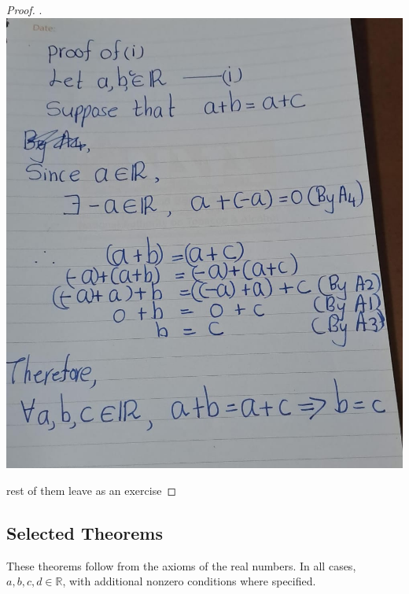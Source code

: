 \documentclass[
]{book}
\theoremstyle{definition}
\theoremstyle{definition}
\theoremstyle{definition}
\theoremstyle{definition}
\theoremstyle{remark}
\begin{document}
\begin{proof}
\leavevmode

.\\

\includegraphics[width=0.8\linewidth,height=\textheight,keepaspectratio]{fig/fig8.jpg}

rest of them leave as an exercise

\end{proof}

\subsection{Selected Theorems}\label{selected-theorems}

These theorems follow from the axioms of the real numbers. In all cases, \(a, b, c, d \in \mathbb{R}\), with additional nonzero conditions where specified.
\end{document}
